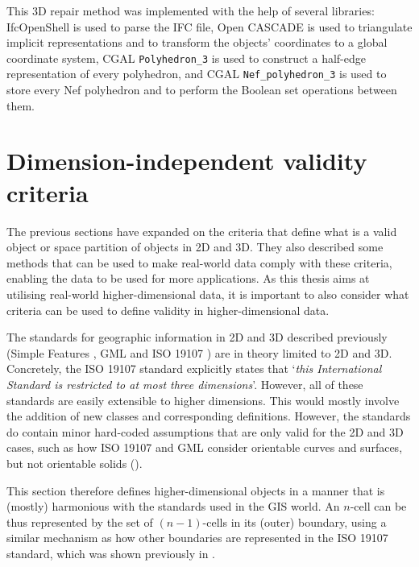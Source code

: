 This 3D repair method was implemented with the help of several libraries: IfcOpenShell is used to parse the IFC file, Open CASCADE is used to triangulate implicit representations and to transform the objects' coordinates to a global coordinate system, CGAL \texttt{Polyhedron\_3} is used to construct a half-edge representation of every polyhedron, and CGAL \texttt{Nef\_polyhedron\_3} is used to store every Nef polyhedron and to perform the Boolean set operations between them.

\section{Dimension-independent validity criteria}
\label{se:ndrepair}

The previous sections have expanded on the criteria that define what is a valid object or space partition of objects in 2D and 3D.
They also described some methods that can be used to make real-world data comply with these criteria, enabling the data to be used for more applications.
As this thesis aims at utilising real-world higher-dimensional data, it is important to also consider what criteria can be used to define validity in higher-dimensional data.

The standards for geographic information in 2D and 3D described previously (Simple Features \citep{SimpleFeatures1}, GML \citep{GML3.3} and ISO 19107 \citep{ISO19107:2005}) are in theory limited to 2D and 3D.
Concretely, the ISO 19107 standard explicitly states that `\emph{this International Standard is restricted to at most three dimensions}'.
However, all of these standards are easily extensible to higher dimensions.
This would mostly involve the addition of new classes and corresponding definitions.
However, the standards do contain minor hard-coded assumptions that are only valid for the 2D and 3D cases, such as how ISO 19107 and GML consider orientable curves and surfaces, but not orientable solids ().

This section therefore defines higher-dimensional objects in a manner that is (mostly) harmonious with the standards used in the GIS world.
An $n$-cell can be thus represented by the set of $(n-1)$-cells in its (outer) boundary, using a similar mechanism as how other boundaries are represented in the ISO 19107 standard, which was shown previously in .

